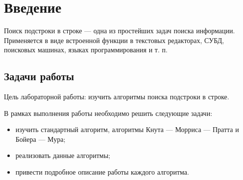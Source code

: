 \chapter*{Введение}

Поиск подстроки в строке — одна из простейших задач поиска информации.
Применяется в виде встроенной функции в текстовых редакторах, СУБД, поисковых машинах, языках программирования и т. п. \cite{Gusfield}

\section*{Задачи работы}

Цель лабораторной работы: изучить алгоритмы поиска подстроки в строке.

В рамках выполнения работы необходимо решить следующие задачи:
\begin{itemize}
	\item изучить стандартный алгоритм, алгоритмы Кнута — Морриса — Пратта и Бойера — Мура;
	\item реализовать данные алгоритмы;
	\item привести подробное описание работы каждого алгоритма.
\end{itemize}
